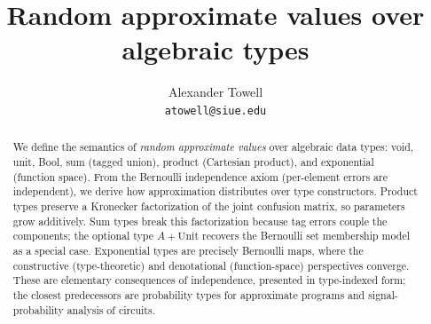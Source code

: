 \documentclass[11pt,final,hidelinks]{article}
\title
{
    Random approximate values over algebraic types
}
\author
{
    Alexander Towell\\
    \texttt{atowell@siue.edu}
}
\date{}
\begin{document}
\maketitle
\begin{abstract}
We define the semantics of \emph{random approximate values} over algebraic data types: void, unit, Bool, sum (tagged union), product (Cartesian product), and exponential (function space).
From the Bernoulli independence axiom (per-element errors are independent), we derive how approximation distributes over type constructors.
Product types preserve a Kronecker factorization of the joint confusion matrix, so parameters grow additively.
Sum types break this factorization because tag errors couple the components; the optional type $A + \mathrm{Unit}$ recovers the Bernoulli set membership model as a special case.
Exponential types are precisely Bernoulli maps, where the constructive (type-theoretic) and denotational (function-space) perspectives converge.
These are elementary consequences of independence, presented in type-indexed form; the closest predecessors are probability types for approximate programs and signal-probability analysis of circuits.
\end{abstract}



\tableofcontents














\end{document}
